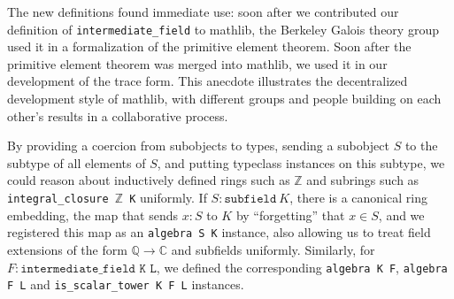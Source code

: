 \documentclass[a4paper,USenglish,cleveref, autoref, thm-restate]{lipics-v2021}
\newcommand{\C}{\mathbb{C}}
\newcommand{\lean}[1]{\texttt{#1}\xspace} %
\newcommand{\mathlib}{\textsf{mathlib}\xspace}
\newcommand{\Q}{\mathbb{Q}}
\newcommand{\Z}{\mathbb{Z}}
\begin{document}
The new definitions found immediate use:
soon after we contributed our definition of \lean{intermediate\_field} to \mathlib,
the Berkeley Galois theory group used it in a formalization of the primitive element theorem.
Soon after the primitive element theorem was merged into \mathlib,
we used it in our development of the trace form.
This anecdote illustrates the decentralized development style of \mathlib,
with different groups and people building on each other's results in a collaborative process.

By providing a coercion from subobjects to types, sending a subobject $S$ to the subtype of all elements of $S$,
and putting typeclass instances on this subtype,
we could reason about inductively defined rings such as $\Z$ and subrings such as \lean{integral\_closure $\Z$ K} uniformly.
If $S : \lean{subfield}\ K$, there is a canonical ring embedding, the map that sends $x : S$ to $K$ by ``forgetting'' that $x \in S$,
and we registered this map as an \lean{algebra S K} instance, also allowing us to treat field extensions of the form $\Q \to \C$ and subfields uniformly.
Similarly, for $F : \lean{intermediate\_field K L}$, we defined the corresponding \lean{algebra K F}, \lean{algebra F L} and \lean{is\_scalar\_tower K F L} instances.
\end{document}
